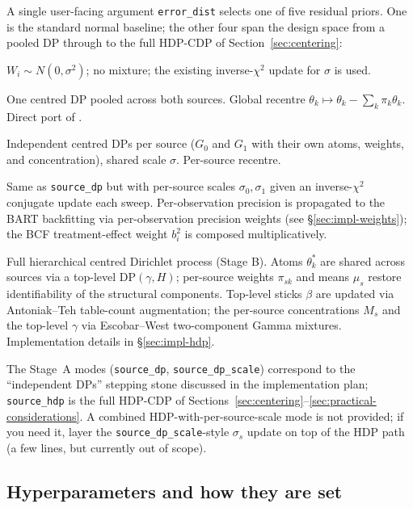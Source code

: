 \documentclass[11pt]{article}
\newcommand{\1}{\mathbf{1}}
\begin{document}
A single user-facing argument \texttt{error\_dist} selects one of five residual priors. One is the standard normal baseline; the other four span the design space from a pooled DP through to the full HDP-CDP of Section~\ref{sec:centering}:
\begin{description}[noitemsep]
  \item[\texttt{gaussian}] $W_i \sim N(0, \sigma^2)$; no mixture; the existing inverse-$\chi^2$ update for $\sigma$ is used.
  \item[\texttt{shared\_dp}] One centred DP pooled across both sources. Global recentre $\theta_k \mapsto \theta_k - \sum_k \pi_k \theta_k$. Direct port of \citet{henderson2020individualized}.
  \item[\texttt{source\_dp}] Independent centred DPs per source ($G_0$ and $G_1$ with their own atoms, weights, and concentration), shared scale $\sigma$. Per-source recentre.
  \item[\texttt{source\_dp\_scale}] Same as \texttt{source\_dp} but with per-source scales $\sigma_0, \sigma_1$ given an inverse-$\chi^2$ conjugate update each sweep. Per-observation precision is propagated to the BART backfitting via per-observation precision weights (see \S\ref{sec:impl-weights}); the BCF treatment-effect weight $b_i^2$ is composed multiplicatively.
  \item[\texttt{source\_hdp}] Full hierarchical centred Dirichlet process (Stage B). Atoms $\theta^*_k$ are shared across sources via a top-level $\mathrm{DP}(\gamma, H)$; per-source weights $\pi_{sk}$ and means $\mu_s$ restore identifiability of the structural components. Top-level sticks $\beta$ are updated via Antoniak--Teh table-count augmentation; the per-source concentrations $M_s$ and the top-level $\gamma$ via Escobar--West two-component Gamma mixtures. Implementation details in \S\ref{sec:impl-hdp}.
\end{description}
The Stage~A modes (\texttt{source\_dp}, \texttt{source\_dp\_scale}) correspond to the ``independent DPs'' stepping stone discussed in the implementation plan; \texttt{source\_hdp} is the full HDP-CDP of Sections~\ref{sec:centering}--\ref{sec:practical-considerations}. A combined HDP-with-per-source-scale mode is not provided; if you need it, layer the \texttt{source\_dp\_scale}-style $\sigma_s$ update on top of the HDP path (a few lines, but currently out of scope).

\subsection{Hyperparameters and how they are set}\label{sec:impl-hyperparams}
\end{document}
